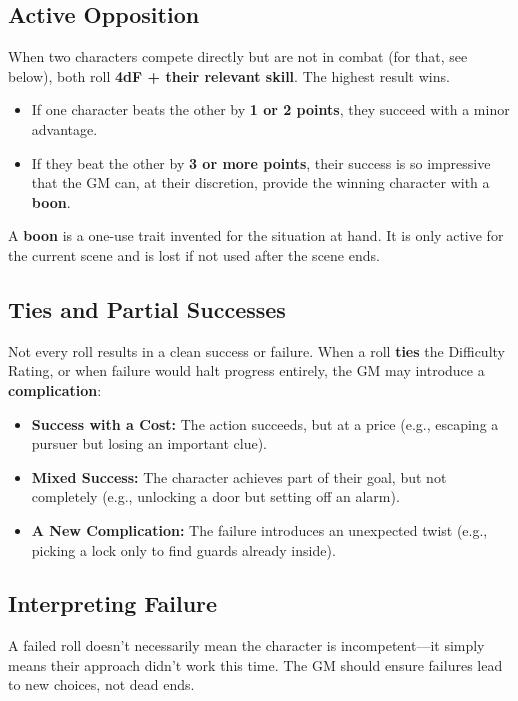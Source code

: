 \subsection{Active Opposition}
When two characters compete directly but are not in combat (for that, see below), both roll \textbf{4dF + their relevant skill}. The highest result wins.

\begin{itemize}
    \item If one character beats the other by \textbf{1 or 2 points}, they succeed with a minor advantage.
    \item If they beat the other by \textbf{3 or more points}, their success is so impressive that the GM can, at their discretion, provide the winning character with a \textbf{boon}.
\end{itemize}

A \textbf{boon} is a one-use trait invented for the situation at hand. It is only active for the current scene and is lost if not used after the scene ends.

\subsection{Ties and Partial Successes}
Not every roll results in a clean success or failure. When a roll \textbf{ties} the Difficulty Rating, or when failure would halt progress entirely, the GM may introduce a \textbf{complication}:

\begin{itemize}
    \item \textbf{Success with a Cost:} The action succeeds, but at a price (e.g., escaping a pursuer but losing an important clue).
    \item \textbf{Mixed Success:} The character achieves part of their goal, but not completely (e.g., unlocking a door but setting off an alarm).
    \item \textbf{A New Complication:} The failure introduces an unexpected twist (e.g., picking a lock only to find guards already inside).
\end{itemize}

\subsection{Interpreting Failure}
A failed roll doesn’t necessarily mean the character is incompetent—it simply means their approach didn’t work this time. The GM should ensure failures lead to new choices, not dead ends.

